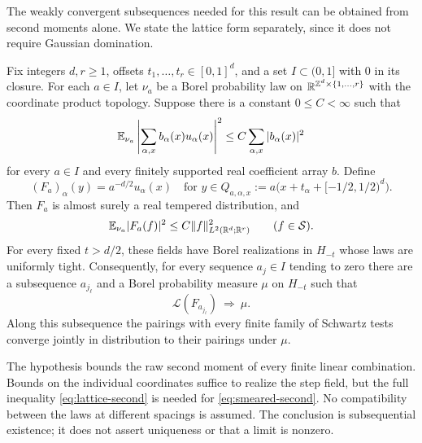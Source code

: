 The weakly convergent subsequences needed for this result can be
obtained from second moments alone. We state the lattice form
separately, since it does not require Gaussian domination.

\begin{theorem}\label{thm:lattice-continuum}
Fix integers $d,r\ge1$, offsets $t_1,\ldots,t_r\in[0,1]^d$,
and a set $I\subset(0,1]$ with $0$ in its closure. For each
$a\in I$, let $\nu_a$ be a Borel probability law on
$\mathbb R^{\mathbb Z^d\times\{1,\ldots,r\}}$ with the coordinate product
topology. Suppose there is a constant $0\le C<\infty$ such that
\begin{equation}\label{eq:lattice-second}
 \mathbb E_{\nu_a}\left|\sum_{\alpha,x}b_\alpha(x)u_\alpha(x)\right|^2
 \le C\sum_{\alpha,x}|b_\alpha(x)|^2
\end{equation}
for every $a\in I$ and every finitely supported real coefficient
array $b$. Define
\begin{equation}\label{eq:step-definition}
 (F_a)_\alpha(y)=a^{-d/2}u_\alpha(x)
 \quad\text{for }y\in Q_{a,\alpha,x}
 :=a\bigl(x+t_\alpha+[-1/2,1/2)^d\bigr).
\end{equation}
Then $F_a$ is almost surely a real tempered distribution, and
\begin{equation}\label{eq:smeared-second}
 \mathbb E_{\nu_a}|F_a(f)|^2\le C\|f\|_{L^2(\mathbb R^d;\mathbb R^r)}^2
 \qquad(f\in\mathcal S).
\end{equation}
For every fixed $t>d/2$, these fields have Borel realizations in
$H_{-t}$ whose laws are uniformly tight. Consequently, for every
sequence $a_j\in I$ tending to zero there are a subsequence
$a_{j_\ell}$ and a Borel probability measure $\mu$ on $H_{-t}$
such that
\[
 \mathcal L(F_{a_{j_\ell}})\ \Longrightarrow\ \mu.
\]
Along this subsequence the pairings with every finite family of
Schwartz tests converge jointly in distribution to their pairings
under $\mu$.
\end{theorem}

The hypothesis bounds the raw second moment of every finite linear
combination. Bounds on the individual coordinates suffice to realize
the step field, but the full inequality \eqref{eq:lattice-second}
is needed for \eqref{eq:smeared-second}. No compatibility between
the laws at different spacings is assumed. The conclusion is
subsequential existence; it does not assert uniqueness or that a
limit is nonzero.


